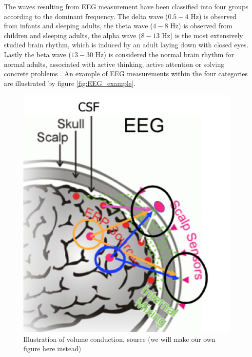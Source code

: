 The waves resulting from EEG measurement have been classified into four groups according to the dominant frequency. The delta wave ($0.5-4$ Hz) is observed from infants and sleeping adults, the theta wave ($4-8$ Hz) is observed from children and sleeping adults, the alpha wave ($8-13$ Hz) is the most extensively studied brain rhythm, which is induced by an adult laying down with closed eyes. Lastly the beta wave ($13-30$ Hz) is considered the normal brain rhythm for normal adults, associated with active thinking, active attention or solving concrete problems \cite[p. 11]{EEGsignalprocessing}. An example of EEG measurements within the four categories are illustrated 
by figure \ref{fig:EEG_example}.        
\begin{figure}[H]
    \begin{minipage}[t]{.45\textwidth}
        \centering
        \includegraphics[width=\textwidth]{figurs/scalp.png}
        \caption{Illustration of volume conduction, source \cite{phd2015}(we will make our own figure here instead)}\label{fig:volumeconduction}
    \end{minipage} 
    \hfill
    \begin{minipage}[t]{.45\textwidth}

\end{minipage}
\end{figure}
